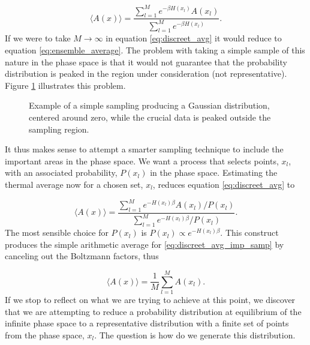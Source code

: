 \documentclass[a4paper]{article}
\newcommand{\bra}{\langle}
\newcommand{\ket}{\rangle}
\begin{document}
\begin{equation}
  \bra A(x) \ket =\frac{\sum_{l=1}^{M} e^{-\beta H(x_l)}
    A(x_l)}{\sum_{l=1}^{M} e^{-\beta H(x_l)}}.\label{eq:discreet_avg}
\end{equation}
If we were to take $M\rightarrow \infty$ in equation
\eqref{eq:discreet_avg} it would reduce to equation
\eqref{eq:ensemble_average}. The problem with taking a simple sample
of this nature in the phase space is that it would not guarantee that the probability
distribution is peaked in the region under consideration (not
representative). Figure \ref{fig:simp_sampling} illustrates this problem.  

\begin{figure}[htb]
  \centering
  \caption{Example of a simple sampling producing a Gaussian
    distribution, centered around zero, while the crucial data is
    peaked outside the sampling region.}\label{fig:simp_sampling}  
\end{figure}
It thus makes sense to attempt a smarter sampling technique to include 
the important areas in the phase space. We want a process that selects 
points, $x_l$, with an associated probability, $P(x_l)$ in the phase
space. Estimating the thermal average now for a chosen set, ${x_l}$,
reduces equation \eqref{eq:discreet_avg} to 

\begin{equation}
  \bra A(x) \ket =\frac{\sum_{l=1}^{M} e^{-H(x_l)\beta}
    A(x_l)/P(x_l)}{\sum_{l=1}^{M} e^{-H(x_l)\beta}/P(x_l)}.\label{eq:discreet_avg_imp_samp}
\end{equation} 
The most sensible choice for $P(x_l)$ is $P(x_l) \propto
e^{-H(x_l)\beta} \label{eq:imp_samp_prob}$. This construct produces the
simple arithmetic average for \eqref{eq:discreet_avg_imp_samp} by
canceling out the Boltzmann factors, thus

\begin{equation}
  \bra A(x) \ket =\frac{1}{M}{\sum_{l=1}^{M}
    A(x_l)}.\label{eq:arithmetic_avg}
\end{equation}  
If we stop to reflect on what we are trying to achieve at this point,
we discover that we are attempting to reduce a probability distribution at
equilibrium of the infinite phase space to a representative
distribution with a finite set of points from the phase space,
${x_l}$. The question is how do we generate this distribution.
\end{document}
